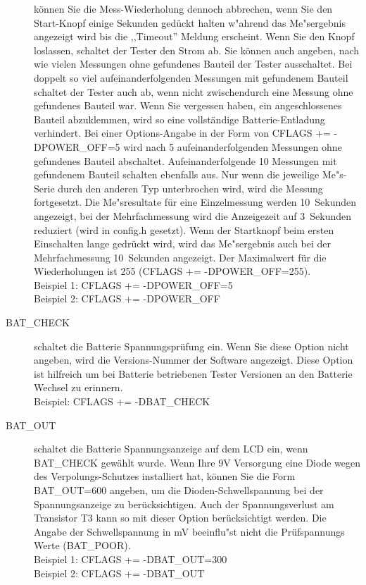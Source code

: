 \begin{description}
k\"onnen Sie die Mess-Wiederholung dennoch abbrechen, wenn Sie den Start-Knopf einige Sekunden ged\"uckt halten 
w"ahrend das Me"sergebnis angezeigt wird bis die ,,Timeout'' Meldung erscheint.
Wenn Sie den Knopf loslassen, schaltet der Tester den Strom ab.
Sie k\"onnen auch angeben, nach wie vielen Messungen ohne gefundenes Bauteil der Tester ausschaltet.
Bei doppelt so viel aufeinanderfolgenden Messungen mit gefundenem Bauteil schaltet der Tester auch ab,
wenn nicht zwischendurch eine Messung ohne gefundenes Bauteil war.
Wenn Sie vergessen haben, ein angeschlossenes Bauteil abzuklemmen, wird so eine vollst\"andige Batterie-Entladung
verhindert.
Bei einer Options-Angabe in der Form von CFLAGS += -DPOWER\_OFF=5 wird nach 5 aufeinanderfolgenden Messungen ohne
gefundenes Bauteil abschaltet. Aufeinanderfolgende 10 Messungen mit gefundenem Bauteil schalten ebenfalls aus.
Nur wenn die jeweilige Me"s-Serie durch den anderen Typ unterbrochen wird, wird die Messung fortgesetzt.
Die Me"sresultate f\"ur eine Einzelmessung werden 10~Sekunden angezeigt, bei der Mehrfachmessung wird die
Anzeigezeit auf 3~Sekunden reduziert (wird in config.h gesetzt).
Wenn der Startknopf beim ersten Einschalten lange gedr\"uckt wird, wird das Me"sergebnis
 auch bei der Mehrfachmessung 10~Sekunden angezeigt.
Der Maximalwert f\"ur die Wiederholungen ist 255 (CFLAGS += -DPOWER\_OFF=255).\\
Beispiel 1: CFLAGS += -DPOWER\_OFF=5 \\
Beispiel 2: CFLAGS += -DPOWER\_OFF 
  \item[BAT\_CHECK] schaltet die Batterie Spannungspr\"ufung ein.
 Wenn Sie diese Option nicht angeben, wird die Versions-Nummer der Software angezeigt.
Diese Option ist hilfreich um bei Batterie betriebenen Tester Versionen an den Batterie Wechsel zu erinnern.\\
Beispiel: CFLAGS += -DBAT\_CHECK
  \item[BAT\_OUT] schaltet die Batterie Spannungsanzeige auf dem LCD ein, wenn BAT\_CHECK gew\"ahlt wurde.
 Wenn Ihre 9V Versorgung eine Diode wegen des Verpolungs-Schutzes installiert hat, k\"onnen Sie 
die Form BAT\_OUT=600 angeben, um die Dioden-Schwellspannung 
bei der Spannungsanzeige zu ber\"ucksichtigen.
Auch der Spannungsverlust am Transistor T3 kann so mit dieser Option ber\"ucksichtigt werden.
Die Angabe der Schwellspannung in mV beeinflu"st nicht die Pr\"uf\-span\-nungs Werte (BAT\_POOR).\\
Beispiel 1: CFLAGS += -DBAT\_OUT=300 \\
Beispiel 2: CFLAGS += -DBAT\_OUT

\end{description}
